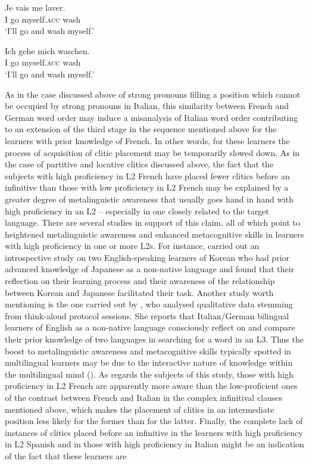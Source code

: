 \documentclass[output=paper,modfonts,nonflat,newtxmath]{langsci/langscibook}
\begin{document}
\ea \label{ex:sciutti:45}
\begin{xlist}
    \ex \label{ex:sciutti:45a}
    \gll Je vais me laver.\\
        I go myself.\textsc{acc} wash\\
    \glt  ‘I’ll go and wash myself.’

    \ex \label{ex:sciutti:45b}
    \gll Ich gehe mich waschen.\\
        I go myself.\textsc{acc} wash\\
    \glt ‘I’ll go and wash myself.’
\end{xlist}
\z

As in the case discussed above of strong pronouns filling a position which cannot be occupied by strong pronouns in Italian, this similarity between French and German word order may induce a misanalysis of Italian word order contributing to an extension of the third stage in the sequence mentioned above for the learners with prior knowledge of French. In other words, for these learners the process of acquisition of clitic placement may be temporarily slowed down. As in the case of partitive and locative clitics discussed above, the fact that the subjects with high proficiency in L2 French have placed fewer clitics before an infinitive than those with low proficiency in L2 French may be explained by a greater degree of metalinguistic awareness that usually goes hand in hand with high proficiency in an L2 – especially in one closely related to the target language. There are several studies in support of this claim, all of which point to heightened metalinguistic awareness and enhanced metacognitive skills in learners with high proficiency in one or more L2s. For instance, \citet{Fouser2001} carried out an introspective study on two English-speaking learners of Korean who had prior advanced knowledge of Japanese as a non-native language and found that their reflection on their learning process and their awareness of the relationship between Korean and Japanese facilitated their task. Another study worth mentioning is the one carried out by \citet{Jessner1999}, who analysed qualitative data stemming from think-aloud protocol sessions. She reports that Italian/German bilingual learners of English as a non-native language consciously reflect on and compare their prior knowledge of two languages in searching for a word in an L3. Thus the boost to metalinguistic awareness and metacognitive skills typically spotted in multilingual learners may be due to the interactive nature of knowledge within the multilingual mind (\citealt{HerdinaJessner2000, HerdinaJessner2002, Jessner2003, Jessner2008DST, Jessner2008Knowledge, Jessner2009}). As regards the subjects of this study, those with high proficiency in L2 French are apparently more aware than the low-proficient ones of the contrast between French and Italian in the complex infinitival clauses mentioned above, which makes the placement of clitics in an intermediate position less likely for the former than for the latter. Finally, the complete lack of instances of clitics placed before an infinitive in the learners with high proficiency in L2 Spanish and in those with high proficiency in Italian might be an indication of the fact that these learners are 
\end{document}
